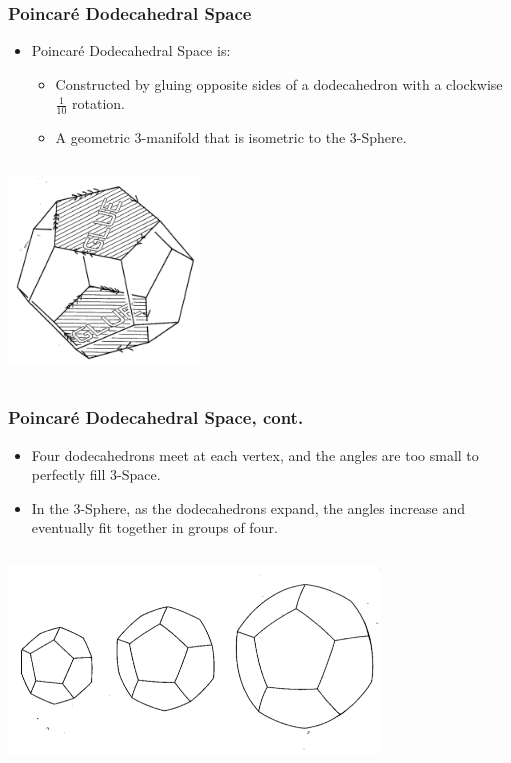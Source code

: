 \documentclass[13pt]{beamer}
\begin{document}
\begin{frame}
\frametitle{Poincar\'e Dodecahedral Space}
  \begin{itemize}
    \item \alert{Poincar\'e Dodecahedral Space} is:
          \begin{itemize}
             \item Constructed by gluing opposite sides of a dodecahedron with a clockwise $\frac{1}{10}$ rotation.
             \item A geometric 3-manifold that is isometric to the 3-Sphere.
           \end{itemize} 
  \end{itemize}

  \begin{columns}[c] %
     \centering
     \includegraphics[height=5cm]{./img/one_tenth}
  \end{columns}
\end{frame}

\begin{frame}
\frametitle{Poincar\'e Dodecahedral Space, cont.}
  \begin{itemize}
    \item Four dodecahedrons meet at each vertex, and the angles are too small to perfectly fill 3-Space.
    \item In the 3-Sphere, as the dodecahedrons expand, the angles increase and eventually fit together in groups of four.
  \end{itemize}

  \begin{columns}[c] %
     \centering
     \includegraphics[height=5cm]{./img/poincarespace}
  \end{columns}
\end{frame}
\end{document}
